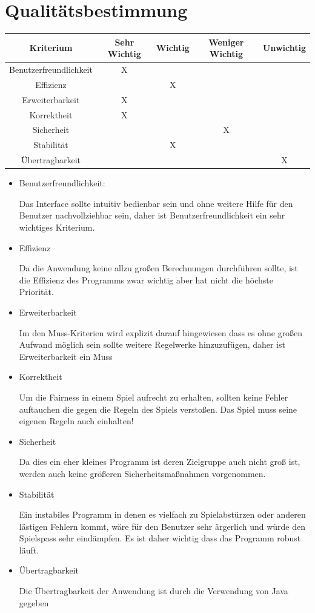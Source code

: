 \documentclass{article}
\begin{document}
\section{Qualitätsbestimmung}
\begin{tabular}{|c|c|c|c|c|}
\hline 
Kriterium & Sehr Wichtig & Wichtig & Weniger Wichtig & Unwichtig \\ 
\hline 
Benutzerfreundlichkeit & X &  &  &  \\ 
\hline 
Effizienz &  & X &  &  \\ 
\hline 
Erweiterbarkeit & X &  &  &  \\ 
\hline 
Korrektheit & X &  &  &  \\ 
\hline 
Sicherheit &  &  & X &  \\ 
\hline 
Stabilität &  & X &  &  \\ 
\hline 
Übertragbarkeit &  &  &  & X \\ 
\hline 
\end{tabular} 

\begin{itemize}
\item Benutzerfreundlichkeit:

Das Interface sollte intuitiv bedienbar sein und ohne weitere Hilfe für den Benutzer nachvollziehbar sein, daher ist Benutzerfreundlichkeit ein sehr wichtiges Kriterium. 

\item Effizienz

Da die Anwendung keine allzu großen Berechnungen durchführen sollte, ist die Effizienz des Programms zwar wichtig aber hat nicht die höchste Priorität.

\item Erweiterbarkeit

Im den Muss-Kriterien wird explizit darauf hingewiesen dass es ohne großen Aufwand möglich sein sollte weitere Regelwerke hinzuzufügen, daher ist Erweiterbarkeit ein Muss

\item Korrektheit

Um die Fairness in einem Spiel aufrecht zu erhalten, sollten keine Fehler auftauchen die gegen die Regeln des Spiels verstoßen. Das Spiel muss seine eigenen Regeln auch einhalten!

\item Sicherheit

Da dies ein eher kleines Programm ist deren Zielgruppe auch nicht groß ist, werden auch keine größeren Sicherheitsmaßnahmen vorgenommen.

\item Stabilität

Ein instabiles Programm in denen es vielfach zu Spielabstürzen oder anderen lästigen Fehlern kommt, wäre für den Benutzer sehr ärgerlich und würde den Spielspass sehr eindämpfen. Es ist daher wichtig dass das Programm robust läuft.

\item Übertragbarkeit

Die Übertragbarkeit der Anwendung ist durch die Verwendung von Java gegeben
\end{itemize}
\newpage
\printglossaries
\end{document}
